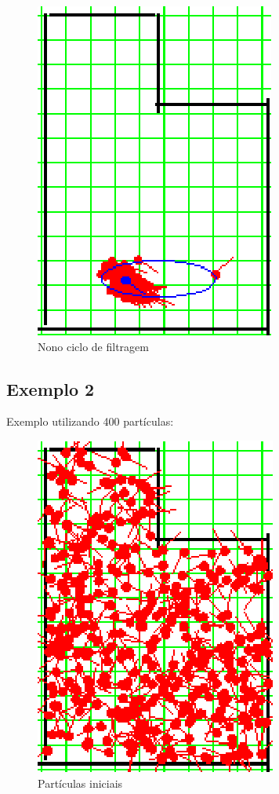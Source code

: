 \begin{figure}[H]
  \centering
  \includegraphics[scale=1]{figuras/cen1_ex1/10.eps}
  \caption[Nono Ciclo de Filtragem]{Nono ciclo de filtragem}
  \label{img:cen1_ex1_10}
\end{figure}

\subsection{Exemplo 2}

Exemplo utilizando 400 partículas:

\begin{figure}[H]
  \centering
  \includegraphics[scale=1]{figuras/cen1_ex2/1.eps}
  \caption[Partículas Iniciais]{Partículas iniciais}
  \label{img:cen1_ex2_1}
\end{figure}

